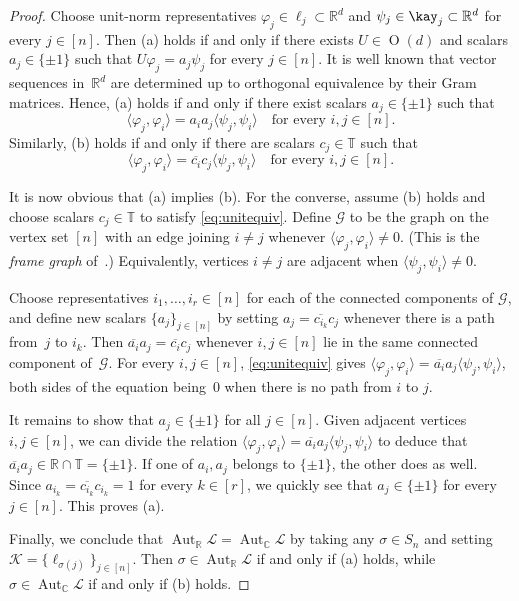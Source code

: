 \begin{proof}
Choose unit-norm representatives $\varphi_j \in \ell_j \subset \mathbb{R}^d$ and $\psi_j \in \kay_j \subset \mathbb{R}^d$ for every $j \in [n]$.
Then (a) holds if and only if there exists $U \in \operatorname{O}(d)$ and scalars $a_j \in \{ \pm 1 \}$ such that $U \varphi_j = a_j \psi_j$ for every $j \in [n]$.
It is well known that vector sequences in~$\mathbb{R}^d$ are determined up to orthogonal equivalence by their Gram matrices.
Hence, (a) holds if and only if there exist scalars $a_j \in \{ \pm 1 \}$ such that
\begin{equation}
\label{eq:orthequiv}
\langle \varphi_j, \varphi_i \rangle = a_i a_j \langle \psi_j, \psi_i \rangle \quad \text{for every }i,j \in [n].
\end{equation}
Similarly, (b) holds if and only if there are scalars $c_j \in \mathbb{T}$ such that 
\begin{equation}
\label{eq:unitequiv}
\langle \varphi_j, \varphi_i \rangle = \overline{c_i} c_j \langle \psi_j, \psi_i \rangle \quad \text{for every }i,j \in [n].
\end{equation}

It is now obvious that (a) implies (b).
For the converse, assume (b) holds and choose scalars $c_j \in \mathbb{T}$ to satisfy \eqref{eq:unitequiv}.
Define $\mathscr{G}$ to be the graph on the vertex set $[n]$ with an edge joining $i \neq j$ whenever $\langle \varphi_j, \varphi_i \rangle \neq 0$.
(This is the \emph{frame graph} of~\cite{Strawn:07,AN:18}.)
Equivalently, vertices $i \neq j$ are adjacent when $\langle \psi_j, \psi_i \rangle \neq 0$.

Choose representatives $i_1,\dotsc,i_r \in [n]$ for each of the connected components of $\mathscr{G}$, and define new scalars $\{ a_j \}_{j\in [n]}$ by setting $a_j = \overline{c_{i_k}} c_j$ whenever there is a path from~$j$ to $i_k$.
Then $\overline{a_i} a_j = \overline{c_i} c_j$ whenever $i,j \in [n]$ lie in the same connected component of~$\mathscr{G}$.
For every $i,j \in [n]$, \eqref{eq:unitequiv} gives $\langle \varphi_j, \varphi_i \rangle = \overline{a_i} a_j \langle \psi_j, \psi_i \rangle$, both sides of the equation being~$0$ when there is no path from $i$ to $j$.

It remains to show that $a_j \in \{\pm 1\}$ for all $j \in [n]$.
Given adjacent vertices $i,j \in [n]$, we can divide the relation $\langle \varphi_j, \varphi_i \rangle = \overline{a_i} a_j \langle \psi_j, \psi_i \rangle$ to deduce that $\overline{a_i} a_j \in \mathbb{R} \cap \mathbb{T} =  \{ \pm 1\}$.
If one of $a_i,a_j$ belongs to $\{\pm 1\}$, the other does as well.
Since $a_{i_k} = \overline{c_{i_k}} c_{i_k} = 1$ for every $k \in [r]$, we quickly see that $a_j \in \{\pm 1\}$ for every $j \in [n]$.
This proves (a).

Finally, we conclude that $\operatorname{Aut}_{\mathbb{R}} \mathscr{L} = \operatorname{Aut}_{\mathbb{C}} \mathscr{L}$ by taking any $\sigma \in S_n$ and setting $\mathscr{K} = \{ \ell_{\sigma(j)} \}_{j \in [n]}$.
Then $\sigma \in \operatorname{Aut}_{\mathbb{R}} \mathscr{L}$ if and only if (a) holds, while $\sigma \in \operatorname{Aut}_{\mathbb{C}} \mathscr{L}$ if and only if (b) holds.
\end{proof}

